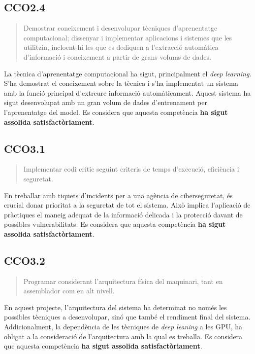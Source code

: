 \subsection*{CCO2.4}
\begin{quote}
    Demostrar coneixement i desenvolupar tècniques d'aprenentatge computacional; dissenyar i implementar aplicacions i sistemes que les utilitzin, incloent-hi les que es dediquen a l'extracció automàtica d'informació i coneixement a partir de grans volums de dades.
\end{quote}
La tècnica d'aprenentatge computacional ha sigut, principalment el \textit{deep learning}. S'ha demostrat el coneixement sobre la tècnica i s'ha implementat un sistema amb la funció principal d'extreure informació automàticament. Aquest sistema ha sigut desenvolupat amb un gran volum de dades d'entrenament per l'aprenentatge del model. Es considera que aquesta competència \textbf{ha sigut assolida satisfactòriament}.

\subsection*{CCO3.1}
\begin{quote}
    Implementar codi crític seguint criteris de temps d'execució, eficiència i seguretat.
\end{quote}
En treballar amb tiquets d'incidents per a una agència de ciberseguretat, és crucial donar prioritat a la seguretat de tot el sistema. Això implica l'aplicació de pràctiques el maneig adequat de la informació delicada i la protecció davant de possibles vulnerabilitats. Es considera que aquesta competència \textbf{ha sigut assolida satisfactòriament}.

\subsection*{CCO3.2}
\begin{quote}
    Programar considerant l'arquitectura física del maquinari, tant en assemblador com en alt nivell.
\end{quote}
En aquest projecte, l'arquitectura del sistema ha determinat no només les possibles tècniques a desenvolupar, sinó que també el rendiment final del sistema. Addicionalment, la dependència de les tècniques de \textit{deep leaning} a les GPU, ha obligat a la consideració de l'arquitectura amb la qual es treballa. Es considera que aquesta competència \textbf{ha sigut assolida satisfactòriament}.
